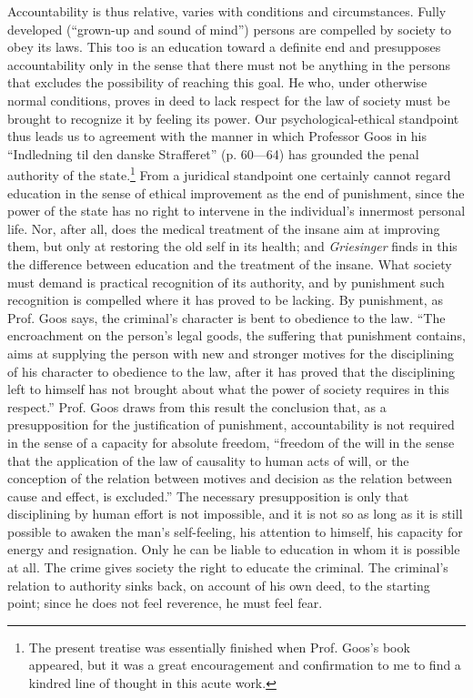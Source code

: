 \documentclass[12pt,a4paper,openany]{book}
\newcommand{\opage}[1]{\marginnote{\footnotesize\textit{[#1]}}}
\begin{document}
Accountability is thus relative, varies with conditions and circumstances.
Fully developed (``grown-up and sound of mind'') persons are compelled by
society to obey its laws. This too is an education toward a definite end and
presupposes accountability only in the sense that there must not be anything
in the persons that excludes the possibility of reaching this goal. He who,
under otherwise normal conditions, proves in deed to lack respect for the
law of society must be brought to recognize it by feeling its power. Our
psychological-ethical standpoint thus leads us to agreement with
\opage{128}the manner in which Professor Goos in his ``Indledning til den
danske Strafferet'' (p. 60---64) has grounded the penal authority of the
state.\footnote[1]{The present treatise was essentially finished when Prof.
Goos's book appeared, but it was a great encouragement and confirmation to
me to find a kindred line of thought in this acute work.} From a juridical
standpoint one certainly cannot regard education in the sense of ethical
improvement as the end of punishment, since the power of the state has no
right to intervene in the individual's innermost personal life. Nor, after
all, does the medical treatment of the insane aim at improving them, but
only at restoring the old self in its health; and \emph{Griesinger} finds in
this the difference between education and the treatment of the insane. What
society must demand is practical recognition of its authority, and by
punishment such recognition is compelled where it has proved to be lacking.
By punishment, as Prof. Goos says, the criminal's character is bent to
obedience to the law. ``The encroachment on the person's legal goods, the
suffering that punishment contains, aims at supplying the person with new
and stronger motives for the disciplining of his character to obedience to
the law, after it has proved that the disciplining left to himself has not
brought about what the power of society requires in this respect.'' Prof.
Goos draws from this result the conclusion that, as a presupposition for the
justification of punishment, accountability is not required in the sense of
a capacity for absolute freedom, ``freedom of the will in the sense that the
application of the law of causality \opage{129}to human acts of will, or the
conception of the relation between motives and decision as the relation
between cause and effect, is excluded.'' The necessary presupposition is
only that disciplining by human effort is not impossible, and it is not so
as long as it is still possible to awaken the man's self-feeling, his
attention to himself, his capacity for energy and resignation. Only he can
be liable to education in whom it is possible at all. The crime gives
society the right to educate the criminal. The criminal's relation to
authority sinks back, on account of his own deed, to the starting point;
since he does not feel reverence, he must feel fear.
\end{document}
